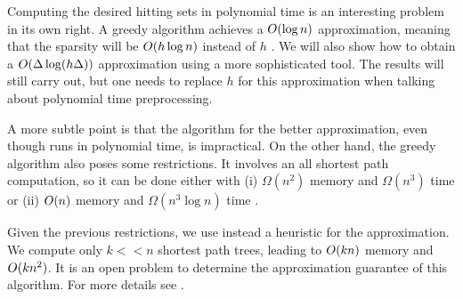 Computing the desired hitting sets in polynomial time is an interesting problem in its own right.
A greedy algorithm achieves a $O(\log n)$ approximation, meaning that the sparsity will be $O(h\log n)$ instead of $h$ .
We will also show how to obtain a $O(\Delta\log(h\Delta))$ approximation using a more sophisticated tool.
The results will still carry out, but one needs to replace $h$ for this approximation when talking about polynomial time preprocessing.

A more subtle point is that the algorithm for the better approximation, even though runs in polynomial time, is impractical.
On the other hand, the greedy algorithm also poses some restrictions.
It involves an all shortest path computation, so it can be done either with (i) $\Omega(n^2)$ memory and $\Omega(n^3)$ time or (ii) $O(n)$ memory and $\Omega(n^3\log n)$ time . 

Given the previous restrictions, we use instead a heuristic for the approximation.
We compute only $k<<n$ shortest path trees, leading to $O(kn)$ memory and $O(kn^2)$.
It is an open problem to determine the approximation guarantee of this algorithm.
For more details see .

